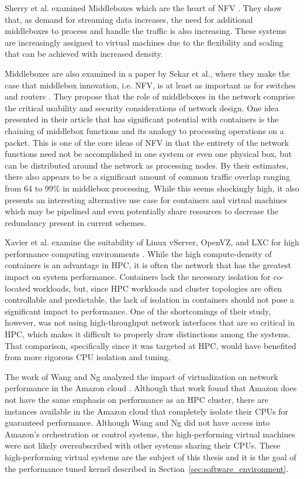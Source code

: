 Sherry et al. examined Middleboxes which are the heart of NFV \autocite{sherry2012making}.
They show that, as demand for streaming data increases, the need for additional middleboxes to process and handle the traffic is also increasing.
These systems are increasingly assigned to virtual machines due to the flexibility and scaling that can be achieved with increased density.

Middleboxes are also examined in a paper by Sekar et al., where they make the case that middlebox innovation, i.e. NFV, is at least as important as for switches and routers \autocite{sekar2011middlebox}.
They propose that the role of middleboxes in the network comprise the critical usability and security considerations of network design.
One idea presented in their article that has significant potential with containers is the chaining of middlebox functions and its analogy to processing operations on a packet.  
This is one of the core ideas of NFV in that the entirety of the network functions need not be accomplished in one system or even one physical box, but can be distributed around the network as processing nodes.  
By their estimates, there also appears to be a significant amount of common traffic overlap ranging from 64 to 99\% in middlebox processing. 
While this seems shockingly high, it also presents an interesting alternative use case for containers and virtual machines which may be pipelined and even potentially share resources to decrease the redundancy present in current schemes.

Xavier et al. examine the suitability of Linux vServer, OpenVZ, and LXC for high performance computing environments \autocite{xavier2013performance}.
While the high compute-density of containers is an advantage in HPC, it is often the network that has the greatest impact on system performance.
Containers lack the necessary isolation for co-located workloads, but, since HPC workloads and cluster topologies are often controllable and predictable, the lack of isolation in containers should not pose a significant impact to performance.
One of the shortcomings of their study, however, was not using high-throughput network interfaces that are so critical in HPC, which makes it difficult to properly draw distinctions among the systems.
That comparison, specifically since it was targeted at HPC, would have benefited from more rigorous CPU isolation and tuning.  

The work of Wang and Ng analyzed the impact of virtualization on network performance in the Amazon cloud \autocite{wangAmazon2010}.
Although that work found that Amazon does not have the same emphasis on performance as an HPC cluster, there are instances available in the Amazon cloud that completely isolate their CPUs for guaranteed performance.  
Although Wang and Ng did not have access into Amazon's orchestration or control systems, the high-performing virtual machines were not likely oversubscribed with other systems sharing their CPUs. 
These high-performing virtual systems are the subject of this thesis and it is the goal of the performance tuned kernel described in Section~\ref{sec:software_environment}.  

